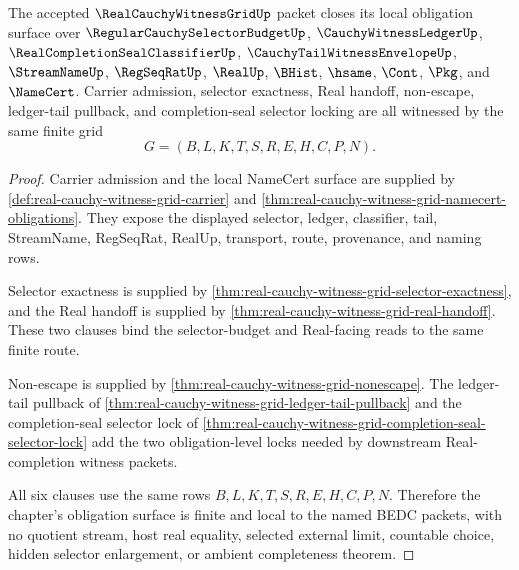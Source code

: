 \begin{theorem}
\label{thm:real-cauchy-witness-grid-obligation-closure}
The accepted $\RealCauchyWitnessGridUp$ packet closes its local obligation surface over $\RegularCauchySelectorBudgetUp$, $\CauchyWitnessLedgerUp$, $\RealCompletionSealClassifierUp$, $\CauchyTailWitnessEnvelopeUp$, $\StreamNameUp$, $\RegSeqRatUp$, $\RealUp$, $\BHist$, $\hsame$, $\Cont$, $\Pkg$, and $\NameCert$. Carrier admission, selector exactness, Real handoff, non-escape, ledger-tail pullback, and completion-seal selector locking are all witnessed by the same finite grid
$$
G=(B,L,K,T,S,R,E,H,C,P,N).
$$
\end{theorem}
\begin{proof}
Carrier admission and the local NameCert surface are supplied by \autoref{def:real-cauchy-witness-grid-carrier} and \autoref{thm:real-cauchy-witness-grid-namecert-obligations}. They expose the displayed selector, ledger, classifier, tail, StreamName, RegSeqRat, RealUp, transport, route, provenance, and naming rows.

Selector exactness is supplied by \autoref{thm:real-cauchy-witness-grid-selector-exactness}, and the Real handoff is supplied by \autoref{thm:real-cauchy-witness-grid-real-handoff}. These two clauses bind the selector-budget and Real-facing reads to the same finite route.

Non-escape is supplied by \autoref{thm:real-cauchy-witness-grid-nonescape}. The ledger-tail pullback of \autoref{thm:real-cauchy-witness-grid-ledger-tail-pullback} and the completion-seal selector lock of \autoref{thm:real-cauchy-witness-grid-completion-seal-selector-lock} add the two obligation-level locks needed by downstream Real-completion witness packets.

All six clauses use the same rows $B,L,K,T,S,R,E,H,C,P,N$. Therefore the chapter's obligation surface is finite and local to the named BEDC packets, with no quotient stream, host real equality, selected external limit, countable choice, hidden selector enlargement, or ambient completeness theorem.
\end{proof}


